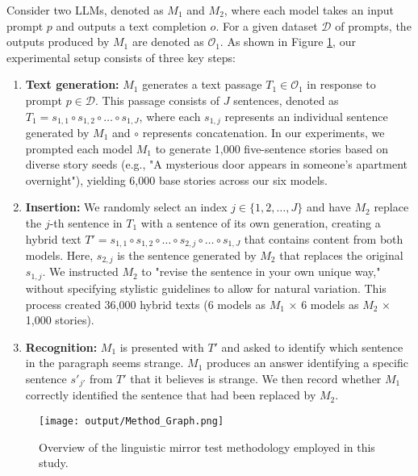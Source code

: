 \documentclass{article}
\begin{document}
Consider two LLMs, denoted as $M_1$ and $M_2$, where each model takes an input prompt $p$ and outputs a text completion $o$. For a given dataset $\mathcal{D}$ of prompts, the outputs produced by $M_1$ are denoted as $\mathcal{O}_1$. As shown in Figure \ref{fig:mirror_test_overview}, our experimental setup consists of three key steps:

\begin{enumerate}
    \item \textbf{Text generation:} $M_1$ generates a text passage $T_1 \in \mathcal{O}_1$ in response to prompt $p \in \mathcal{D}$. This passage consists of $J$ sentences, denoted as $T_1 = s_{1,1} \circ s_{1,2} \circ \ldots \circ s_{1,J}$, where each $s_{1,j}$ represents an individual sentence generated by $M_1$ and $\circ$ represents concatenation. In our experiments, we prompted each model $M_1$ to generate 1,000 five-sentence stories based on diverse story seeds (e.g., "A mysterious door appears in someone's apartment overnight"), yielding 6,000 base stories across our six models.
    
    \item \textbf{Insertion:} We randomly select an index $j \in \{1, 2, \ldots, J\}$ and have $M_2$ replace the $j$-th sentence in $T_1$ with a sentence of its own generation, creating a hybrid text $T' = s_{1,1} \circ s_{1,2} \circ \ldots \circ s_{2,j} \circ \ldots \circ s_{1,J}$ that contains content from both models. Here, $s_{2,j}$ is the sentence generated by $M_2$ that replaces the original $s_{1,j}$. We instructed $M_2$ to "revise the sentence in your own unique way," without specifying stylistic guidelines to allow for natural variation. This process created 36,000 hybrid texts (6 models as $M_1$ × 6 models as $M_2$ × 1,000 stories).
    
    \item \textbf{Recognition:} $M_1$ is presented with $T'$ and asked to identify which sentence in the paragraph seems strange. $M_1$ produces an answer identifying a specific sentence $s'_{j'}$ from $T'$ that it believes is strange. We then record whether $M_1$ correctly identified the sentence that had been replaced by $M_2$.
\end{enumerate}



\begin{figure}[ht]
    \centering
    \texttt{[image: output/Method\_Graph.png]}
\caption{Overview of the linguistic mirror test methodology employed in this study.}
    \label{fig:mirror_test_overview}
\end{figure}
\end{document}
